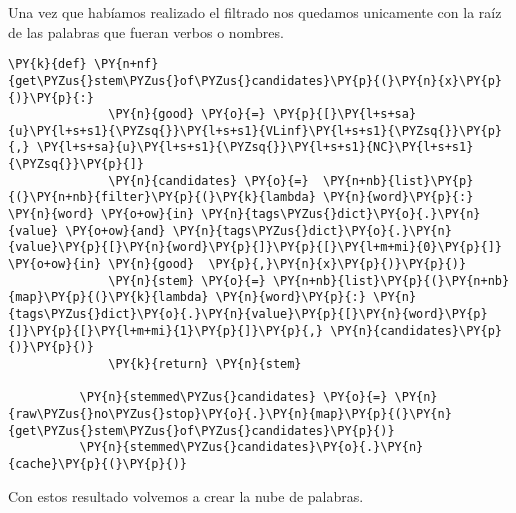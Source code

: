              Una vez que habíamos realizado el filtrado nos quedamos unicamente con la raíz de las palabras que fueran
          verbos o nombres.
          
          \vspace{0.5cm}
          
              \begin{tcolorbox}[breakable, size=fbox, boxrule=1pt, pad at break*=1mm,colback=cellbackground, colframe=cellborder]
          \begin{Verbatim}[commandchars=\\\{\}]
          \PY{k}{def} \PY{n+nf}{get\PYZus{}stem\PYZus{}of\PYZus{}candidates}\PY{p}{(}\PY{n}{x}\PY{p}{)}\PY{p}{:}
              \PY{n}{good} \PY{o}{=} \PY{p}{[}\PY{l+s+sa}{u}\PY{l+s+s1}{\PYZsq{}}\PY{l+s+s1}{VLinf}\PY{l+s+s1}{\PYZsq{}}\PY{p}{,} \PY{l+s+sa}{u}\PY{l+s+s1}{\PYZsq{}}\PY{l+s+s1}{NC}\PY{l+s+s1}{\PYZsq{}}\PY{p}{]}
              \PY{n}{candidates} \PY{o}{=}  \PY{n+nb}{list}\PY{p}{(}\PY{n+nb}{filter}\PY{p}{(}\PY{k}{lambda} \PY{n}{word}\PY{p}{:} \PY{n}{word} \PY{o+ow}{in} \PY{n}{tags\PYZus{}dict}\PY{o}{.}\PY{n}{value} \PY{o+ow}{and} \PY{n}{tags\PYZus{}dict}\PY{o}{.}\PY{n}{value}\PY{p}{[}\PY{n}{word}\PY{p}{]}\PY{p}{[}\PY{l+m+mi}{0}\PY{p}{]} \PY{o+ow}{in} \PY{n}{good}  \PY{p}{,}\PY{n}{x}\PY{p}{)}\PY{p}{)}
              \PY{n}{stem} \PY{o}{=} \PY{n+nb}{list}\PY{p}{(}\PY{n+nb}{map}\PY{p}{(}\PY{k}{lambda} \PY{n}{word}\PY{p}{:} \PY{n}{tags\PYZus{}dict}\PY{o}{.}\PY{n}{value}\PY{p}{[}\PY{n}{word}\PY{p}{]}\PY{p}{[}\PY{l+m+mi}{1}\PY{p}{]}\PY{p}{,} \PY{n}{candidates}\PY{p}{)}\PY{p}{)}
              \PY{k}{return} \PY{n}{stem}
              
          \PY{n}{stemmed\PYZus{}candidates} \PY{o}{=} \PY{n}{raw\PYZus{}no\PYZus{}stop}\PY{o}{.}\PY{n}{map}\PY{p}{(}\PY{n}{get\PYZus{}stem\PYZus{}of\PYZus{}candidates}\PY{p}{)}    
          \PY{n}{stemmed\PYZus{}candidates}\PY{o}{.}\PY{n}{cache}\PY{p}{(}\PY{p}{)}
          \end{Verbatim}
          \end{tcolorbox}
         
         Con estos resultado volvemos a crear la nube de palabras.  
         
         \vspace{0.5cm}

